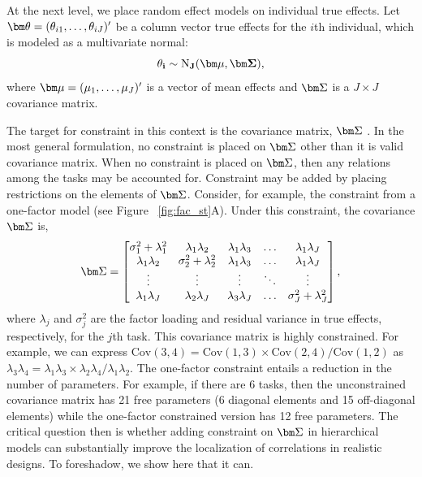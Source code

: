 \documentclass[man, 12pt]{apa7} %
\begin{document}
At the next level, we place random effect models on individual true effects.  Let $\bftheta=(\theta_{i1},\ldots,\theta_{iJ})'$ be a column vector true effects for the $i$th individual, which is modeled as a multivariate normal:
\begin{equation} \label{eq:true_effect_mat}
\bf{\theta}_i \sim \mbox{N}_J(\bfmu,\bfSigma),
\end{equation}
where $\bfmu=(\mu_1,\ldots,\mu_J)'$ is a vector of mean effects and $\bfSigma$ is a $J \times J$ covariance matrix.  

The target for constraint in this context is the covariance matrix, $\bfSigma$ \parencite[]{Bollen.1989}. In the most general formulation, no constraint is placed on $\bfSigma$ other than it is valid covariance matrix.  When no constraint is placed on $\bfSigma$, then any relations among the tasks may be accounted for.  Constraint may be added by placing restrictions on the elements of $\bfSigma$.  Consider, for example, the constraint from a one-factor model (see Figure ~\ref{fig:fac_st}A).  Under this constraint, the covariance $\bfSigma$ is,
\begin{equation} \label{eq:oneFacVar}
\bfSigma=
\begin{bmatrix}
\sigma^2_1+\lambda_1^2 & \lambda_1\lambda_2 & \lambda_1\lambda_3 &\ldots &\lambda_1\lambda_J\\
\lambda_1 \lambda_2 & \sigma^2_2+\lambda^2_2 & \lambda_1\lambda_3 &\ldots &\lambda_1\lambda_J\\
\vdots & \vdots & \vdots & \ddots & \vdots\\
\lambda_1\lambda_J & \lambda_2 \lambda_J & \lambda_3\lambda_J & \ldots & \sigma^2_J+\lambda^2_J
\end{bmatrix},
\end{equation}
where $\lambda_j$ and $\sigma^2_j$ are the factor loading and residual variance in true effects, respectively, for the $j$th task.  This covariance matrix is highly constrained.  For example, we can express $\mbox{Cov}(3,4)=\mbox{Cov}(1,3)\times\mbox{Cov}(2,4)/\mbox{Cov}(1,2)$ as $\lambda_3\lambda_4=\lambda_1\lambda_3\times\lambda_2\lambda_4/\lambda_1\lambda_2$.   The one-factor constraint entails a reduction in the number of  parameters.  For example, if there are 6 tasks, then the unconstrained covariance matrix has  21 free parameters (6 diagonal elements and 15 off-diagonal elements) while the one-factor constrained version has 12 free parameters.  The critical question then is whether adding constraint on $\bfSigma$ in hierarchical models can substantially improve the localization of correlations in realistic designs.  To foreshadow, we show here that it can.
\end{document}
